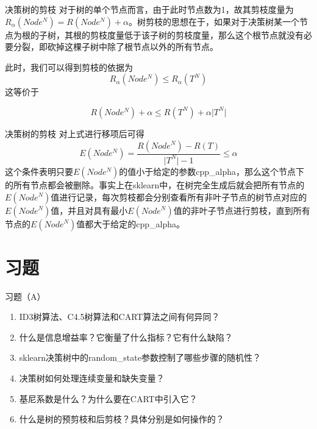 \documentclass{ctexbeamer}        %
\begin{document}
\begin{frame}{决策树的剪枝}
对于树的单个节点而言，由于此时节点数为1，故其剪枝度量为$R_\alpha(Node^N)=R(Node^N)+\alpha$。树剪枝的思想在于，如果对于决策树某一个节点为根的子树，其根的剪枝度量低于该子树的剪枝度量，那么这个根节点就没有必要分裂，即砍掉这棵子树中除了根节点以外的所有节点。
\newline

此时，我们可以得到剪枝的依据为
$$
R_{\alpha}(Node^N)\leq R_{\alpha}(T^N)
$$
这等价于

$$
R(Node^N)+\alpha \leq R(T^N) + \alpha \vert T^N\vert
$$
\end{frame}
\begin{frame}{决策树的剪枝}
对上式进行移项后可得
$$
E(Node^N) = \frac{R(Node^N)-R(T)}{\vert T^N\vert -1}\leq \alpha
$$
这个条件表明只要$E(Node^N)$的值小于给定的参数cpp\_alpha，那么这个节点下的所有节点都会被删除。事实上在sklearn中，在树完全生成后就会把所有节点的$E(Node^N)$值进行记录，每次剪枝都会分别查看所有非叶子节点的树节点对应的$E(Node^N)$值，并且对具有最小$E(Node^N)$值的非叶子节点进行剪枝，直到所有节点的$E(Node^N)$值都大于给定的cpp\_alpha。
\end{frame}
\section{习题}

\begin{frame}[allowframebreaks]{习题（A）}
\begin{enumerate}
\item ID3树算法、C4.5树算法和CART算法之间有何异同？
\item 什么是信息增益率？它衡量了什么指标？它有什么缺陷？
\item sklearn决策树中的random\_state参数控制了哪些步骤的随机性？
\item 决策树如何处理连续变量和缺失变量？
\item 基尼系数是什么？为什么要在CART中引入它？
\item 什么是树的预剪枝和后剪枝？具体分别是如何操作的？
\end{enumerate}
\end{frame}
\end{document}
